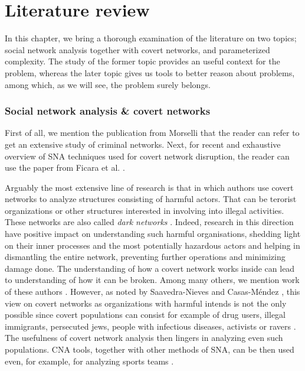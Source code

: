 \chapter{Literature review}

In this chapter, we bring a thorough examination of the literature on two topics;
social network analysis together with covert networks, and parameterized complexity.
The study of the former topic provides an useful context for the \HL problem, whereas
the later topic gives us tools to better reason about \NPh problems, among which, as we will see, the \HL problem surely belongs.

\subsection{Social network analysis \& covert networks}

First of all, we mention the publication from Morselli \cite{Morselli2009} that the reader can refer to get
an extensive study of criminal networks.
Next, for recent and exhaustive overview of SNA techniques used for covert network disruption,
the reader can use the paper from Ficara et al. \cite{Ficara2022}.

Arguably the most extensive line of research is that in which authors use covert networks to analyze structures consisting of
harmful actors.
That can be terorist organizations or other structures interested in involving into illegal activities. These networks are
also called \emph{dark networks} \cite{Raab2003}.
Indeed, research in this direction have positive impact on understanding such harmful organisations,
shedding light on their inner processes and the most potentially hazardous actors and helping in dismantling the entire network,
preventing further operations and minimizing damage done.
The understanding of how a covert network works inside can lead to understanding of how it can be broken.
Among many others, we mention work of these authors \cite{Waniek2017,Dey2019,Raab2003,Lindelauf2009,Xu2005,Ressler2006, SaavedraNieves2023}.
However, as noted by Saavedra-Nieves and Casas-Méndez \cite{SaavedraNieves2023}, this view on covert networks as organizations with harmful
intends is not the only possible since covert populations can consist for example of drug users, illegal immigrants, persecuted jews,
people with infectious diseases, activists or ravers \cite{Oliver2014}.
The usefulness of covert network analysis then lingers in analyzing even such populations.
CNA tools, together with other methods of SNA, can be then used even, for example, for analyzing sports teams \cite{Buldú2019}.

